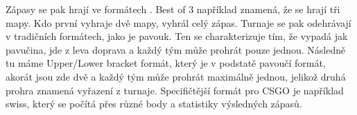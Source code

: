 Zápasy se pak hrají ve formátech . Best of 3 například znamená, že se hrají tři mapy.
Kdo první vyhraje dvě mapy, vyhrál celý zápas. Turnaje se pak odehrávají v tradičních
formátech, jako je pavouk. Ten se charakterizuje tím, že vypadá jak pavučina, jde z leva doprava a každý tým může prohrát pouze jednou. Následně tu máme
Upper/Lower bracket formát, který je v podstatě pavoučí formát, akorát jsou zde dvě  a každý tým může prohrát maximálně jednou, jelikož druhá prohra
znamená vyřazení z turnaje. Specifičtější formát pro \ac{CSGO} je například swiss, který se počítá přes různé body a statistiky výsledných zápasů.